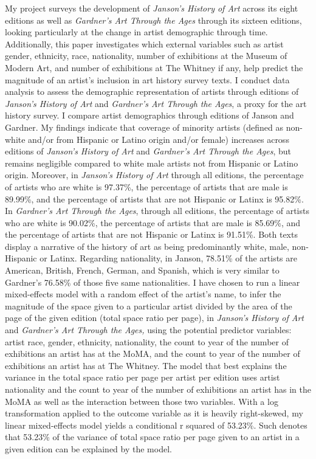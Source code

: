 \documentclass[
  letterpaper,
  DIV=11,
  numbers=noendperiod]{scrreprt}
\begin{document}
My project surveys the development of \emph{Janson's History of Art}
across its eight editions as well as \emph{Gardner's Art Through the
Ages} through its sixteen editions, looking particularly at the change
in artist demographic through time. Additionally, this paper
investigates which external variables such as artist gender, ethnicity,
race, nationality, number of exhibitions at the Museum of Modern Art,
and number of exhibitions at The Whitney if any, help predict the
magnitude of an artist's inclusion in art history survey texts. I
conduct data analysis to assess the demographic representation of
artists through editions of \emph{Janson's History of Art} and
\emph{Gardner's Art Through the Ages}, a proxy for the art history
survey. I compare artist demographics through editions of Janson and
Gardner. My findings indicate that coverage of minority artists (defined
as non-white and/or from Hispanic or Latino origin and/or female)
increases across editions of \emph{Janson's History of Art} and
\emph{Gardner's Art Through the Ages}, but remains negligible compared
to white male artists not from Hispanic or Latino origin. Moreover, in
\emph{Janson's History of Art} through all editions, the percentage of
artists who are white is 97.37\%, the percentage of artists that are
male is 89.99\%, and the percentage of artists that are not Hispanic or
Latinx is 95.82\%. In \emph{Gardner's Art Through the Ages}, through all
editions, the percentage of artists who are white is 90.02\%, the
percentage of artists that are male is 85.69\%, and the percentage of
artists that are not Hispanic or Latinx is 91.51\%. Both texts display a
narrative of the history of art as being predominantly white, male,
non-Hispanic or Latinx. Regarding nationality, in Janson, 78.51\% of the
artists are American, British, French, German, and Spanish, which is
very similar to Gardner's 76.58\% of those five same nationalities. I
have chosen to run a linear mixed-effects model with a random effect of
the artist's name, to infer the magnitude of the space given to a
particular artist divided by the area of the page of the given edition
(total space ratio per page), in \emph{Janson's History of Art} and
\emph{Gardner's Art Through the Ages,} using the potential predictor
variables: artist race, gender, ethnicity, nationality, the count to
year of the number of exhibitions an artist has at the MoMA, and the
count to year of the number of exhibitions an artist has at The Whitney.
The model that best explains the variance in the total space ratio per
page per artist per edition uses artist nationality and the count to
year of the number of exhibitions an artist has in the MoMA as well as
the interaction between those two variables. With a log transformation
applied to the outcome variable as it is heavily right-skewed, my linear
mixed-effects model yields a conditional r squared of 53.23\%. Such
denotes that 53.23\% of the variance of total space ratio per page given
to an artist in a given edition can be explained by the model.
\end{document}
